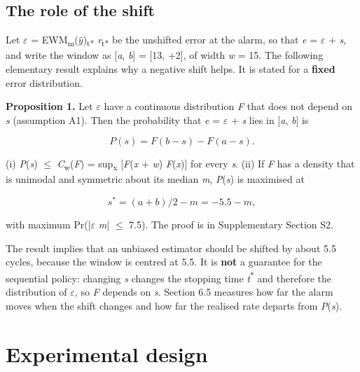 \documentclass[a4paper,fleqn,doubleblind]{cas-dc}
\begin{document}
\subsection{The role of the shift}

Let $\varepsilon$ = EWM\textsubscript{m}($\hat{y}$)\textsubscript{t*} \textminus{} \textit{r}\textsubscript{t*} be the unshifted error at the alarm, so that \textit{e} = $\varepsilon$ + \textit{s}, and write the window as [\textit{a}, \textit{b}] = [\textminus{}13, +2], of width \textit{w} = 15. The following elementary result explains why a negative shift helps. It is stated for a \textbf{fixed} error distribution.

\textbf{Proposition 1.} Let $\varepsilon$ have a continuous distribution \textit{F} that does not depend on \textit{s} (assumption A1). Then the probability that \textit{e} = $\varepsilon$ + \textit{s} lies in [\textit{a}, \textit{b}] is

\begin{equation}
P(s) = F(b - s) - F(a - s).
\end{equation}

(i) \textit{P}(\textit{s}) $\le$ \textit{C}\textsubscript{w}(\textit{F}) = sup\textsubscript{x} [\textit{F}(\textit{x} + \textit{w}) \textminus{} \textit{F}(\textit{x})] for every \textit{s}. (ii) If \textit{F} has a density that is unimodal and symmetric about its median \textit{m}, \textit{P}(\textit{s}) is maximised at

\begin{equation}
s^{*} = (a + b)/2 - m = -5.5 - m,
\end{equation}

with maximum Pr(|$\varepsilon$ \textminus{} \textit{m}| $\le$ 7.5). The proof is in Supplementary Section S2.

The result implies that an unbiased estimator should be shifted by about \textminus{}5.5 cycles, because the window is centred at \textminus{}5.5. It is \textbf{not} a guarantee for the sequential policy: changing \textit{s} changes the stopping time \textit{t}\textsuperscript{*} and therefore the distribution of $\varepsilon$, so \textit{F} depends on \textit{s}. Section 6.5 measures how far the alarm moves when the shift changes and how far the realised rate departs from \textit{P}(\textit{s}).

\section{Experimental design}\label{sec:5}
\end{document}
